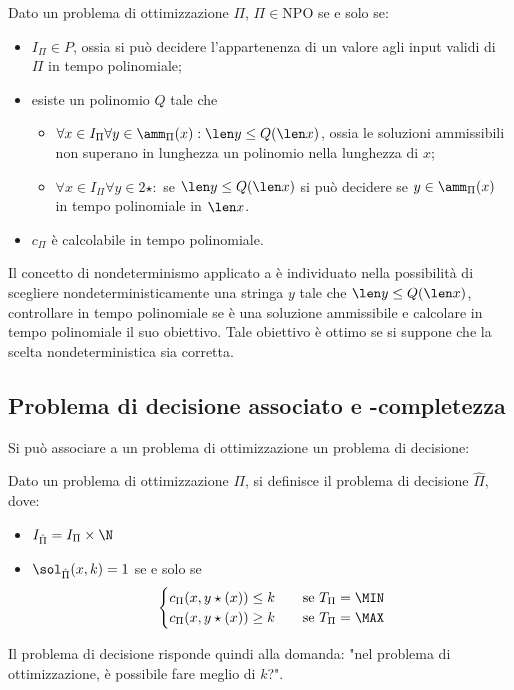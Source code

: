 \begin{defin}[\NPO]
	Dato un problema di ottimizzazione $\Pi$, $\Pi\in\text{NPO}$ se e solo se:
	\begin{itemize}
		\item $I_\Pi\in P$, ossia si può decidere l'appartenenza di un valore agli input validi di $\Pi$ in tempo polinomiale;
		\item esiste un polinomio $Q$ tale che
		      \begin{itemize}
			      \item $\forall x\in I_\Pi \forall y\in\amm_\Pi(x): \len y\leq Q(\len x)$, ossia le soluzioni ammissibili non superano in lunghezza un polinomio nella lunghezza di $x$;
			      \item $\forall x\in I_\Pi \forall y\in 2\star:$ se $\len y\leq Q(\len x)$ si può decidere se $y\in\amm_\Pi(x)$ in tempo polinomiale in $\len x$.
		      \end{itemize}
		\item $c_\Pi$ è calcolabile in tempo polinomiale.
	\end{itemize}
\end{defin}
Il concetto di nondeterminismo applicato a \NPO è individuato nella possibilità di scegliere nondeterministicamente una stringa $y$ tale che $\len y\leq Q(\len x)$, controllare in tempo polinomiale se è una soluzione ammissibile e calcolare in tempo polinomiale il suo obiettivo. Tale obiettivo è ottimo se si suppone che la scelta nondeterministica sia corretta.


\subsection{Problema di decisione associato e \texorpdfstring{\NPO}{NPO}-completezza}
Si può associare a un problema di ottimizzazione un problema di decisione:
\begin{defin}
	Dato un problema di ottimizzazione $\Pi$, si definisce il problema di decisione $\hat\Pi$, dove:
	\begin{itemize}
		\item $I_{\hat\Pi}=I_\Pi\times\N$
		\item $\sol_{\hat\Pi}(x,k)=1$ se e solo se
		      \begin{equation*}
			      \begin{cases}
				      c_\Pi(x,y\star(x))\leq k \quad & \text{se } T_\Pi=\MIN \\
				      c_\Pi(x,y\star(x))\geq k \quad & \text{se } T_\Pi=\MAX
			      \end{cases}
		      \end{equation*}
	\end{itemize}
\end{defin}
Il problema di decisione risponde quindi alla domanda: "nel problema di ottimizzazione, è possibile fare meglio di $k$?".

